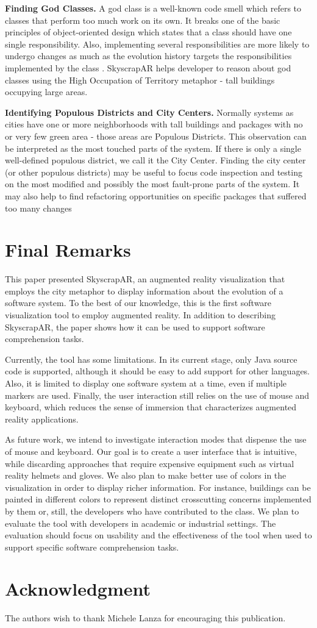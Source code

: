 \textbf{Finding God Classes.} A god class is a well-known code smell which refers to classes that perform too much work on its own. It breaks one of the basic principles of object-oriented design which states that a class should have one single responsibility. Also, implementing several responsibilities are more likely to undergo changes as much as the evolution history targets the responsibilities implemented by the class \cite{silva:2012}. SkyscrapAR helps developer to reason about god classes using the High Occupation of Territory metaphor - tall buildings occupying large areas.

\textbf{Identifying Populous Districts and City Centers.} Normally systems as cities have one or more neighborhoods with tall buildings and packages with no or very few green area - those areas are Populous Districts. This observation can be interpreted as the most touched parts of the system. If there is only a single well-defined populous district, we call it the City Center. Finding the city center (or other populous districts) may be useful to focus code inspection and testing on the most modified and possibly the most fault-prone parts of the system. It may also help to find refactoring opportunities on specific packages that suffered too many changes

\section{Final Remarks} \label{sec:finalRemarks}
This paper presented SkyscrapAR, an augmented reality visualization that employs the city metaphor to display information about the evolution of a software system. To the best of our knowledge, this is the first software visualization tool to employ augmented reality. In addition to describing SkyscrapAR, the paper shows how it can be used to support software comprehension tasks.

Currently, the tool has some limitations. In its current stage, only Java source code is supported, although it should be easy to add support for other languages. Also, it is limited to display one software system at a time, even if multiple markers are used. Finally, the user interaction still relies on the use of mouse and keyboard, which reduces the sense of immersion that characterizes augmented reality applications.

As future work, we intend to investigate interaction modes that dispense the use of mouse and keyboard. Our goal is to create a user interface that is intuitive, while discarding approaches that require expensive equipment such as virtual reality helmets and gloves. We also plan to make better use of colors in the visualization in order to display richer information. For instance, buildings can be painted in different colors to represent distinct crosscutting concerns implemented by them or, still, the developers who have contributed to the class. We plan to evaluate the tool with developers in academic or industrial settings. The evaluation should focus on usability and the effectiveness of the tool when used to support specific software comprehension tasks.

\section*{Acknowledgment}
The authors wish to thank Michele Lanza for encouraging this publication.
